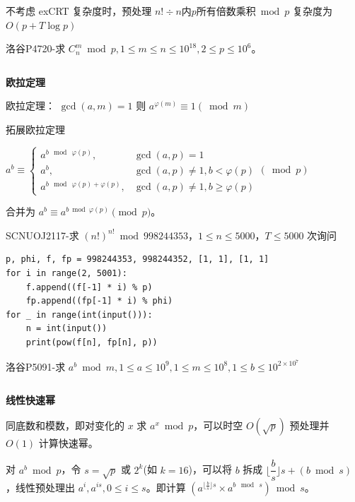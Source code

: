 \documentclass[twocolumn,10pt]{ctexart}
\makeatletter
\newcommand{\hfive}[1]{\par\addvspace{6pt}\@afterindentfalse
  {\noindent\bfseries\normalsize #1}\par\nobreak\vspace{2pt}}
\makeatother
\begin{document}
不考虑 exCRT 复杂度时，预处理 $n!\div n\text{内}p\text{所有倍数乘积}\bmod p$ 复杂度为 $O(p+T\log p)$

\begin{notebox}
洛谷P4720-求 $C_n^m\bmod p,\allowbreak{}1\le m\le n\le 10^{18},\allowbreak{}2\le p\le 10^6$。
\end{notebox}

\inputminted{cpp}{code/p4720_exlucas.cpp}

\hfive{欧拉定理}

欧拉定理： $\gcd(a,m)=1$ 则 $a^{\varphi(m)}\equiv 1(\bmod m)$

拓展欧拉定理

\begin{adjustbox}{max width=\linewidth,center}
$a^b\equiv\begin{cases}
a^{b\ \bmod\ \varphi(p)},&\gcd(a,p)=1\\
a^b,&\gcd(a,p)\neq1,b < \varphi(p)\\
a^{b\ \bmod\ \varphi(p)+\varphi(p)},&\gcd(a,p)\neq1,b\ge\varphi(p)
\end{cases}(\bmod p)$
\end{adjustbox}

合并为 $a^b\equiv a^{b\bmod\varphi(p)}\pmod p$。

\begin{notebox}
SCNUOJ2117-求 $(n!)^{n!}\bmod998244353$，$1\le n\le5000$，$T\le5000$ 次询问
\end{notebox}

\begin{verbatim}
p, phi, f, fp = 998244353, 998244352, [1, 1], [1, 1]
for i in range(2, 5001):
    f.append((f[-1] * i) % p)
    fp.append((fp[-1] * i) % phi)
for _ in range(int(input())):
    n = int(input())
    print(pow(f[n], fp[n], p))
\end{verbatim}

\begin{notebox}
洛谷P5091-求 $a^b\bmod m,\allowbreak{}1\le a\le10^9,\allowbreak{}1\le m\le10^8,\allowbreak{}1\le b\le10^{2\times10^7}$
\end{notebox}

\inputminted{cpp}{code/ext_005.cpp}

\hfive{线性快速幂}

同底数和模数，即对变化的 $x$ 求 $a^x\bmod p$，可以时空 $O(\sqrt p)$ 预处理并 $O(1)$ 计算快速幂。

对 $a^b\bmod p$，令 $s=\sqrt p$ 或 $2^k$(如 $k=16$)，可以将 $b$ 拆成 $\lfloor\dfrac bs\rfloor s+(b\bmod s)$，线性预处理出 $a^i,a^{is},0\le i\le s$。即计算 $(a^{\lfloor\frac bs\rfloor s}\times a^{b\ \bmod \ s})\bmod s$。
\end{document}
